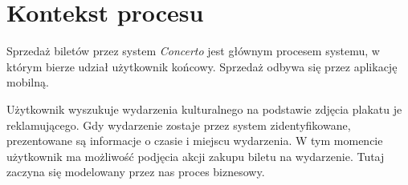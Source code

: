 \section{Kontekst procesu}

Sprzedaż biletów przez system \emph{Concerto} jest głównym procesem systemu, w
którym bierze udział użytkownik końcowy. Sprzedaż odbywa się przez aplikację
mobilną.

Użytkownik wyszukuje wydarzenia kulturalnego na podstawie zdjęcia plakatu je
reklamującego. Gdy wydarzenie zostaje przez system zidentyfikowane, prezentowane
są informacje o czasie i miejscu wydarzenia. W tym momencie użytkownik ma
możliwość podjęcia akcji zakupu biletu na wydarzenie. Tutaj zaczyna się
modelowany przez nas proces biznesowy.
